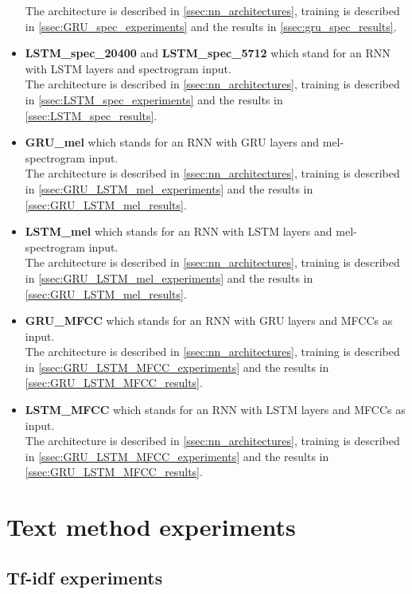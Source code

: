 \begin{itemize}
    The architecture is described in \ref{ssec:nn_architectures}, training is described in \ref{ssec:GRU_spec_experiments} and the results in \ref{ssec:gru_spec_results}.
    \item \textbf{LSTM\_spec\_20400} and \textbf{LSTM\_spec\_5712} which stand for an RNN with LSTM layers and spectrogram input. \\
        The architecture is described in \ref{ssec:nn_architectures}, training is described in \ref{ssec:LSTM_spec_experiments} and the results in \ref{ssec:LSTM_spec_results}.
    \item \textbf{GRU\_mel} which stands for an RNN with GRU layers and mel- spectrogram input. \\
        The architecture is described in \ref{ssec:nn_architectures}, training is described in \ref{ssec:GRU_LSTM_mel_experiments} and the results in \ref{ssec:GRU_LSTM_mel_results}.
    \item \textbf{LSTM\_mel} which stands for an RNN with LSTM layers and mel- spectrogram input. \\
    The architecture is described in \ref{ssec:nn_architectures}, training is described in \ref{ssec:GRU_LSTM_mel_experiments} and the results in \ref{ssec:GRU_LSTM_mel_results}.
    \item \textbf{GRU\_MFCC} which stands for an RNN with GRU layers and MFCCs as input. \\
        The architecture is described in \ref{ssec:nn_architectures}, training is described in \ref{ssec:GRU_LSTM_MFCC_experiments} and the results in \ref{ssec:GRU_LSTM_MFCC_results}.
    \item \textbf{LSTM\_MFCC} which stands for an RNN with LSTM layers and MFCCs as input. \\
        The architecture is described in \ref{ssec:nn_architectures}, training is described in \ref{ssec:GRU_LSTM_MFCC_experiments} and the results in \ref{ssec:GRU_LSTM_MFCC_results}.

    
\end{itemize}

\section{Text method experiments}\label{sec:text_experiments}

\subsection{Tf-idf experiments}\label{ssec:TF_idf_experiments}

